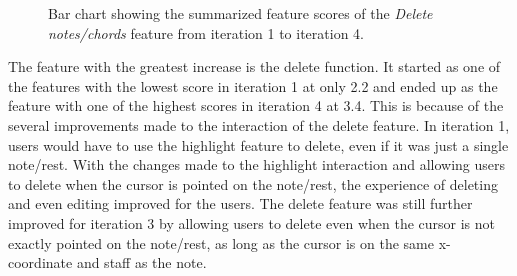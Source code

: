 		\begin{figure}[H]
			\centering
		    \caption{Bar chart showing the summarized feature scores of the \textit{Delete notes/chords} feature from iteration 1 to iteration 4.}
		    \label{fig:delete-bar}
		\end{figure} 

		The feature with the greatest increase is the delete function. It started as one of the features with the lowest score in iteration 1 at only 2.2 and ended up as the feature with one of the highest scores in iteration 4 at 3.4. This is because of the several improvements made to the interaction of the delete feature. In iteration 1, users would have to use the highlight feature to delete, even if it was just a single note/rest. With the changes made to the highlight interaction and allowing users to delete when the cursor is pointed on the note/rest, the experience of deleting and even editing improved for the users. The delete feature was still further improved for iteration 3 by allowing users to delete even when the cursor is not exactly pointed on the note/rest, as long as the cursor is on the same x-coordinate and staff as the note. 

